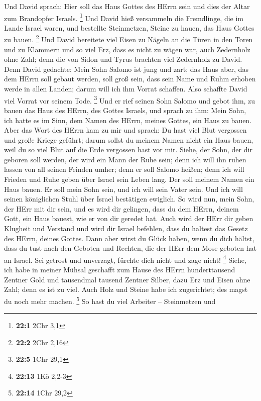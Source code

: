  Und David sprach: Hier soll das Haus Gottes des HErrn
sein und dies der Altar zum Brandopfer Israels. \footnote{\textbf{22:1}
  2Chr 3,1}  Und David hieß versammeln die Fremdlinge, die
im Lande Israel waren, und bestellte Steinmetzen, Steine zu hauen, das
Haus Gottes zu bauen. \footnote{\textbf{22:2} 2Chr 2,16} 
Und David bereitete viel Eisen zu Nägeln an die Türen in den Toren und
zu Klammern und so viel Erz, dass es nicht zu wägen war, 
auch Zedernholz ohne Zahl; denn die von Sidon und Tyrus brachten viel
Zedernholz zu David.  Denn David gedachte: Mein Sohn
Salomo ist jung und zart; das Haus aber, das dem HErrn soll gebaut
werden, soll groß sein, dass sein Name und Ruhm erhoben werde in allen
Landen; darum will ich ihm Vorrat schaffen. Also schaffte David viel
Vorrat vor seinem Tode. \footnote{\textbf{22:5} 1Chr 29,1}
 Und er rief seinen Sohn Salomo und gebot ihm, zu bauen
das Haus des HErrn, des Gottes Israels,  und sprach zu
ihm: Mein Sohn, ich hatte es im Sinn, dem Namen des HErrn, meines
Gottes, ein Haus zu bauen.  Aber das Wort des HErrn kam zu
mir und sprach: Du hast viel Blut vergossen und große Kriege geführt;
darum sollst du meinem Namen nicht ein Haus bauen, weil du so viel Blut
auf die Erde vergossen hast vor mir.  Siehe, der Sohn, der
dir geboren soll werden, der wird ein Mann der Ruhe sein; denn ich will
ihn ruhen lassen von all seinen Feinden umher; denn er soll Salomo
heißen; denn ich will Frieden und Ruhe geben über Israel sein Leben
lang.  Der soll meinem Namen ein Haus bauen. Er soll mein
Sohn sein, und ich will sein Vater sein. Und ich will seinen königlichen
Stuhl über Israel bestätigen ewiglich.  So wird nun, mein
Sohn, der HErr mit dir sein, und es wird dir gelingen, dass du dem
HErrn, deinem Gott, ein Haus bauest, wie er von dir geredet hat.
 Auch wird der HErr dir geben Klugheit und Verstand und
wird dir Israel befehlen, dass du haltest das Gesetz des HErrn, deines
Gottes.  Dann aber wirst du Glück haben, wenn du dich
hältst, dass du tust nach den Geboten und Rechten, die der HErr dem Mose
geboten hat an Israel. Sei getrost und unverzagt, fürchte dich nicht und
zage nicht! \footnote{\textbf{22:13} 1Kö 2,2-3}  Siehe,
ich habe in meiner Mühsal geschafft zum Hause des HErrn hunderttausend
Zentner Gold und tausendmal tausend Zentner Silber, dazu Erz und Eisen
ohne Zahl; denn es ist zu viel. Auch Holz und Steine habe ich
zugerichtet; des magst du noch mehr machen. \footnote{\textbf{22:14}
  1Chr 29,2}  So hast du viel Arbeiter -- Steinmetzen und
